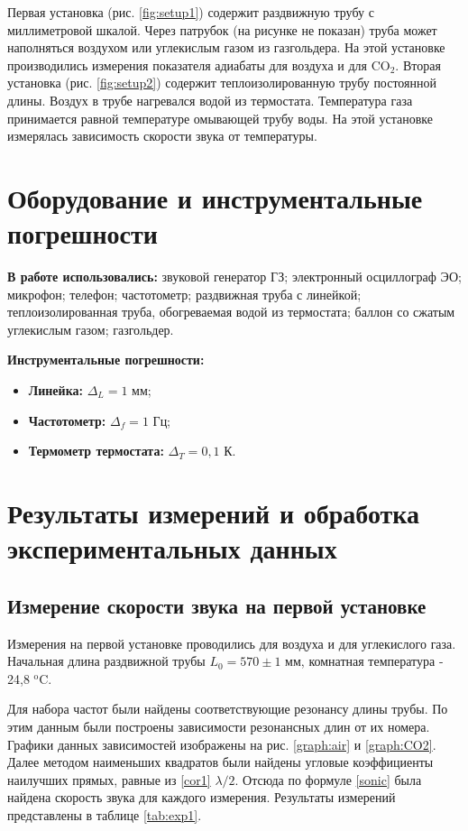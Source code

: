 \documentclass[a4paper,12pt]{article} %
\begin{document}
Первая установка (рис. \ref{fig:setup1}) содержит раздвижную трубу с миллиметровой шкалой. Через патрубок (на рисунке не показан) труба может наполняться воздухом или углекислым газом из газгольдера. На этой установке производились измерения показателя адиабаты для воздуха и для CO$_2$. Вторая установка (рис. \ref{fig:setup2}) содержит теплоизолированную трубу постоянной длины. Воздух в трубе нагревался водой из термостата. Температура газа принимается равной температуре омывающей трубу воды. На этой установке измерялась зависимость скорости звука от температуры.

\section{Оборудование и инструментальные погрешности}

\textbf{В работе использовались:} звуковой генератор ГЗ; электронный
осциллограф ЭО; микрофон; телефон; частотометр; раздвижная труба с линейкой; теплоизолированная труба, обогреваемая водой из термостата; баллон со сжатым углекислым газом; газгольдер.

\textbf{Инструментальные погрешности:} 

\begin{itemize}
    \item \textbf{Линейка:} $\Delta_L = 1$ мм;
    \item \textbf{Частотометр:} $\Delta_f = 1$ Гц; 
    \item \textbf{Термометр термостата:} $\Delta_T = 0,1$ К.
\end{itemize}

\section{Результаты измерений и обработка экспериментальных данных}

\subsection{Измерение скорости звука на первой установке}

Измерения на первой установке проводились для воздуха и для углекислого газа. Начальная длина раздвижной трубы $L_0 = 570 \pm 1$ мм, комнатная температура - 24,8 $^\text{o}$C. 

Для набора частот были найдены соответствующие резонансу длины трубы. По этим данным были построены зависимости резонансных длин от их номера. Графики данных зависимостей изображены на рис. \ref{graph:air} и \ref{graph:CO2}. Далее методом наименьших квадратов были найдены угловые коэффициенты наилучших прямых, равные из \eqref{cor1} $\lambda/2$. Отсюда по формуле \eqref{sonic} была найдена скорость звука для каждого измерения. Результаты измерений представлены в таблице \ref{tab:exp1}.
\end{document}
